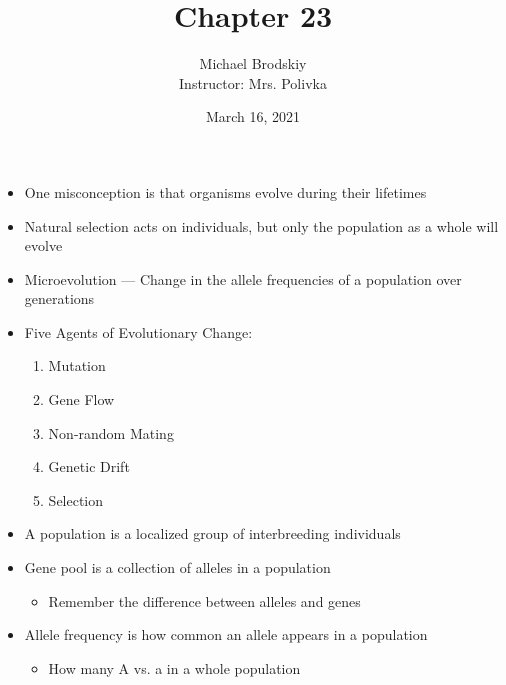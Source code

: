 \documentclass[12pt]{article}
\title{Chapter 23}
\date{March 16, 2021}
\author{Michael Brodskiy\\ \small Instructor: Mrs. Polivka}
\begin{document}
\maketitle

\begin{itemize}

  \item One misconception is that organisms evolve during their lifetimes

  \item Natural selection acts on individuals, but only the population as a whole will evolve

  \item Microevolution — Change in the allele frequencies of a population over generations
    
  \item Five Agents of Evolutionary Change:

    \begin{enumerate}

      \item Mutation

      \item Gene Flow

      \item Non-random Mating

      \item Genetic Drift

      \item Selection

    \end{enumerate}

  \item A population is a localized group of interbreeding individuals

  \item Gene pool is a collection of alleles in a population

    \begin{itemize}

      \item Remember the difference between alleles and genes

    \end{itemize}
    
  \item Allele frequency is how common an allele appears in a population

    \begin{itemize}

      \item How many A vs. a in a whole population


\end{itemize}
\end{itemize}
\end{document}
